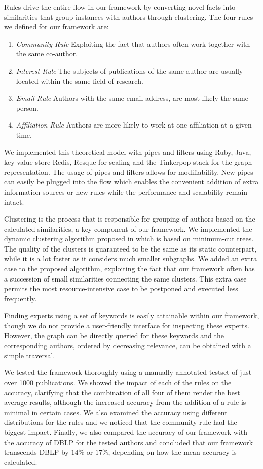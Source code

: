 Rules drive the entire flow in our framework by converting novel facts into similarities that group instances with authors through clustering. The four rules we defined for our framework are:

\begin{enumerate}
	\item \textit{Community Rule} Exploiting the fact that authors often work together with the same co-author.
	\item \textit{Interest Rule} The subjects of publications of the same author are usually located within the same field of research.
	\item \textit{Email Rule} Authors with the same email address, are most likely the same person.
	\item \textit{Affiliation Rule} Authors are more likely to work at one affiliation at a given time.
\end{enumerate}

We implemented this theoretical model with pipes and filters using Ruby, Java, key-value store Redis, Resque for scaling and the Tinkerpop stack for the graph representation. The usage of pipes and filters allows for modifiability. New pipes can easily be plugged into the flow which enables the convenient addition of extra information sources or new rules while the performance and scalability remain intact.

Clustering is the process that is responsible for grouping of authors based on the calculated similarities, a key component of our framework. We implemented the dynamic clustering algorithm proposed in \cite{saha2006dynamic} which is based on minimum-cut trees. The quality of the clusters is guaranteed to be the same as its static counterpart, while it is a lot faster as it considers much smaller subgraphs. We added an extra case to the proposed algorithm, exploiting the fact that our framework often has a succession of small similarities connecting the same clusters. This extra case permits the most resource-intensive case to be postponed and executed less frequently.

Finding experts using a set of keywords is easily attainable within our framework, though we do not provide a user-friendly interface for inspecting these experts. However, the graph can be directly queried for these keywords and the corresponding authors, ordered by decreasing relevance, can be obtained with a simple traversal.

We tested the framework thoroughly using a manually annotated testset of just over 1000 publications. We showed the impact of each of the rules on the accuracy, clarifying that the combination of all four of them render the best average results, although the increased accuracy from the addition of a rule is minimal in certain cases. We also examined the accuracy using different distributions for the rules and we noticed that the community rule had the biggest impact. Finally, we also compared the accuracy of our framework with the accuracy of DBLP for the tested authors and concluded that our framework transcends DBLP by $14\%$ or $17\%$, depending on how the mean accuracy is calculated.

